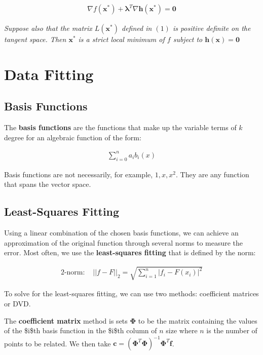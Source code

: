 \documentclass[11pt]{article}
\begin{document}
\begin{align*}
    \nabla f\left(\boldsymbol{x}^{*}\right) + \boldsymbol{\lambda}^{T}\nabla\boldsymbol{h}\left(\boldsymbol{x}^{*}\right) = \boldsymbol{0}
\end{align*}

\emph{Suppose also that the matrix \(L\left(\boldsymbol{x}^{*}\right)\) defined in \(\left(1\right)\) is positive definite on the tangent space. Then \(\boldsymbol{x}^{*}\) is a strict local minimum of \(f\) subject to \(\boldsymbol{h}\left(\boldsymbol{x}\right) = \boldsymbol{0}\)}

\section{Data Fitting}
\label{sec:org21273c4}
\subsection{Basis Functions}
\label{sec:org48bf234}
The \textbf{basis functions} are the functions that make up the variable terms of \(k\) degree for an algebraic function of the form:

\begin{align*}
    \sum_{i = 0}^{n} a_{i}b_{i}\left(x\right)
\end{align*}

Basis functions are not necessarily, for example, \(1, x, x^{2}\). They are any function that spans the vector space.

\subsection{Least-Squares Fitting}
\label{sec:orgdc0a7aa}
Using a linear combination of the chosen basis functions, we can achieve an approximation of the original function through several norms to measure the error. Most often, we use the \textbf{least-squares fitting} that is defined by the norm:

\begin{align*}
    2\text{-norm: } &\lvert\lvert f - F \lvert\lvert_{2} = \sqrt{\sum_{i=1}^{n} \lvert f_{i} - F\left(x_{i}\right)\rvert^{2}}
\end{align*}

To solve for the least-squares fitting, we can use two methods: coefficient matrices or DVD.

The \textbf{coefficient matrix} method is sets \(\boldsymbol{\Phi}\) to be the matrix containing the values of the \$i\$th basis function in the \$i\$th column of \(n\) size where \(n\) is the number of points to be related. We then take \(\boldsymbol{c} = \left(\boldsymbol{\Phi}^{T}\boldsymbol{\Phi}\right)^{-1}\boldsymbol{\Phi}^{T}\boldsymbol{f}\).
\end{document}
